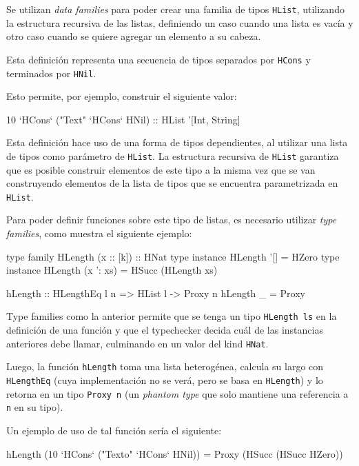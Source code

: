 Se utilizan \textit{data families} para poder crear una familia de tipos \texttt{HList}, utilizando la estructura recursiva de las listas, definiendo un caso cuando una lista es vacía y otro caso cuando se quiere agregar un elemento a su cabeza.

Esta definición representa una secuencia de tipos separados por \texttt{HCons} y terminados por \texttt{HNil}.

Esto permite, por ejemplo, construir el siguiente valor:

\begin{code}
10 `HCons` ("Text" `HCons` HNil) :: HList '[Int, String]
\end{code}

Esta definición hace uso de una forma de tipos dependientes, al utilizar una lista de tipos como parámetro de \texttt{HList}. La estructura recursiva de \texttt{HList} garantiza que es posible construir elementos de este tipo a la misma vez que se van construyendo elementos de la lista de tipos que se encuentra parametrizada en \texttt{HList}.

Para poder definir funciones sobre este tipo de listas, es necesario utilizar \textit{type families}, como muestra el siguiente ejemplo:

\begin{code}
type family HLength (x :: [k]) :: HNat
type instance HLength '[] = HZero
type instance HLength (x ': xs) = HSucc (HLength xs)

hLength   :: HLengthEq l n => HList l -> Proxy n
hLength _ =  Proxy
\end{code}

Type families como la anterior permite que se tenga un tipo \texttt{HLength ls} en la definición de una función y que el typechecker decida cuál de las instancias anteriores debe llamar, culminando en un valor del kind \texttt{HNat}.

Luego, la función \texttt{hLength} toma una lista heterogénea, calcula su largo con \texttt{HLengthEq} (cuya implementación no se verá, pero se basa en \texttt{HLength}) y lo retorna en un tipo \texttt{Proxy n} (un \textit{phantom type} que solo mantiene una referencia a \texttt{n} en su tipo).

Un ejemplo de uso de tal función sería el siguiente:

\begin{code}
hLength (10 `HCons` ("Texto" `HCons` HNil)) = 
  Proxy (HSucc (HSucc HZero))
\end{code}


